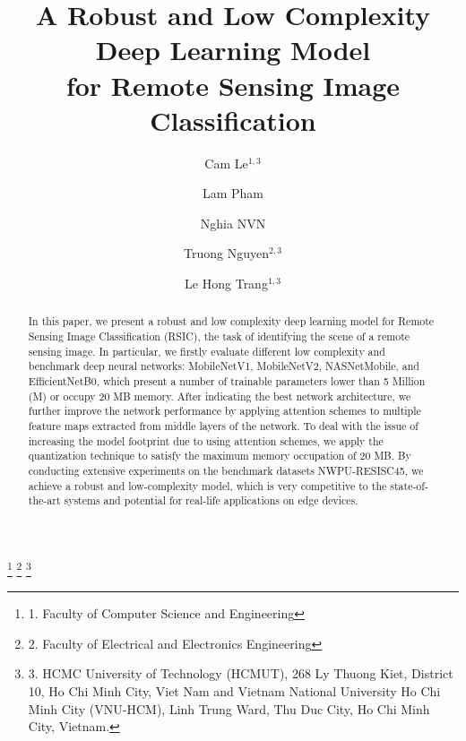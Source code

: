 \documentclass[sigconf]{acmart}
\begin{document}
\title{A Robust and Low Complexity Deep Learning Model \\ for Remote Sensing Image Classification}


\author{Cam Le$^{1,3}$}

\author{Lam Pham}

\author{Nghia NVN}

\author{Truong Nguyen$^{2,3}$} %

\author{Le Hong Trang$^{1,3}$} %

\thanks{1. Faculty of Computer Science and Engineering}
\thanks{2. Faculty of Electrical and Electronics Engineering}
\thanks{3. HCMC University of Technology (HCMUT), 268 Ly Thuong Kiet, District 10, Ho Chi Minh City, Viet Nam and Vietnam National University Ho Chi Minh City (VNU-HCM), Linh Trung Ward, Thu Duc City, Ho Chi Minh City, Vietnam.}


\renewcommand{\shortauthors}{Cam Le et al.}

\begin{abstract}
In this paper, we present a robust and low complexity deep learning model for Remote Sensing Image Classification (RSIC), the task of identifying the scene of a remote sensing image.
In particular, we firstly evaluate different low complexity and benchmark deep neural networks: MobileNetV1, MobileNetV2, NASNetMobile, and EfficientNetB0, which present a number of trainable parameters lower than 5 Million (M) or occupy 20 MB memory.
After indicating the best network architecture, we further improve the network performance by applying attention schemes to multiple feature maps extracted from middle layers of the network.
To deal with the issue of increasing the model footprint due to using attention schemes, we apply the quantization technique to satisfy the maximum memory occupation of 20 MB.
By conducting extensive experiments on the benchmark datasets NWPU-RESISC45, we achieve a robust and low-complexity model, which is very competitive to the state-of-the-art systems and potential for real-life applications on edge devices.
\end{abstract}
\end{document}
